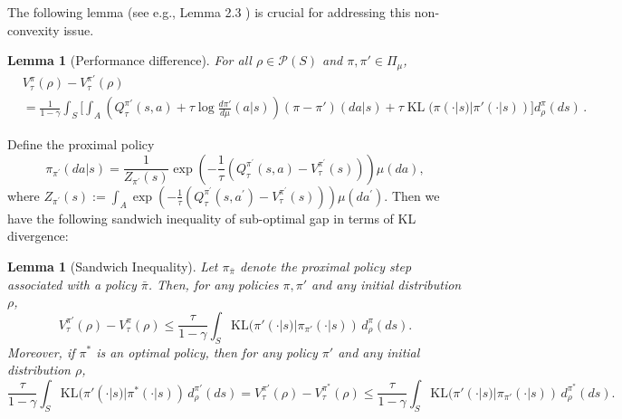 \documentclass{amsart}
\newtheorem{lemma}[theorem]{Lemma}
\theoremstyle{definition}
\begin{document}
The following lemma (see e.g., Lemma 2.3 \cite{kerimkulov2025fisher}) is crucial for addressing this non-convexity issue. 
\begin{lemma}[Performance difference]
\label{lem:app:mdp:performance_diff}
For all $\rho \in \mathcal{P}(S)$ and $\pi,\pi'\in \Pi_{\mu}$, 
\begin{align*}
&V^{\pi}_\tau(\rho)-V^{\pi'}_\tau(\rho) \\
& = \frac{1}{1-\gamma}\int_S \bigg[\int_A\left(Q^{\pi'}_{\tau}(s,a)+\tau \log \frac{d \pi'}{d\mu}(a|s)\right)(\pi-\pi')(da|s) + \tau    \operatorname{KL}(\pi(\cdot | s)|\pi'(\cdot | s)) \bigg]d^{\pi}_\rho(ds)\,.
\end{align*}
\end{lemma}

Define the proximal policy
\begin{equation}\label{eq:app:mdp:proximal_policy}
\pi_{\pi^{\prime}}(d a | s)=\frac{1}{Z_{\pi^{\prime}}(s)} \exp \left(-\frac{1}{\tau}\left(Q^{\pi^{\prime}}_\tau(s, a)-V^{\pi^{\prime}}_
\tau(s)\right)\right) \mu(d a),
\end{equation}
where $Z_{\pi^{\prime}}(s):=\int_A \exp \left(-\frac{1}{\tau}\left(Q^{\pi^{\prime}}_\tau\left(s, a^{\prime}\right)-V^{\pi^{\prime}}_\tau(s)\right)\right) \mu\left(d a^{\prime}\right)$.
Then we have the following sandwich inequality of sub-optimal gap in terms of KL divergence:
\begin{lemma}[Sandwich Inequality]\label{lem:sandwich-inequality}
Let $\pi_{\bar\pi}$ denote the proximal policy step associated with a policy
$\bar\pi$. 
Then, for any policies $\pi,\pi'$ and any initial distribution
$\rho$,
\begin{equation}
V_\tau^{\pi'}(\rho)-V_\tau^\pi(\rho)
\le
\frac{\tau}{1-\gamma}
\int_S
\mathrm{KL}(\pi'(\cdot | s)| \pi_{\pi'}(\cdot |s))
\,d_\rho^\pi(ds).
\label{eq:sandwich-general-bound}
\end{equation}
Moreover, if $\pi^*$ is an optimal policy, then for any policy $\pi'$ and any
initial distribution $\rho$,
\begin{equation}
\frac{\tau}{1-\gamma}
\int_S
\mathrm{KL}(\pi'(\cdot | s)| \pi^*(\cdot | s))
\,d_\rho^{\pi'}(ds)
=
V_\tau^{\pi'}(\rho)-V_\tau^{\pi^*}(\rho)
\le
\frac{\tau}{1-\gamma}
\int_S
\mathrm{KL}(\pi'(\cdot | s)| \pi_{\pi'}(\cdot |s))
\,d_\rho^{\pi^*}(ds).
\label{eq:sandwich-inequality}
\end{equation}
\end{lemma}
\end{document}
